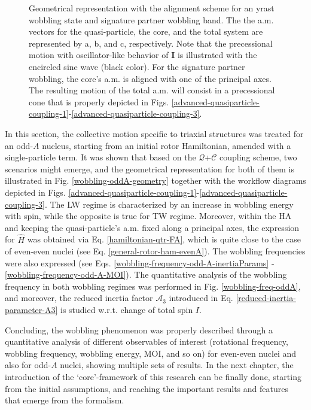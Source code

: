 \begin{figure}
    \caption{Geometrical representation with the alignment scheme for an yrast wobbling state and signature partner wobbling band. The the a.m. vectors for the quasi-particle, the core, and the total system are represented by a, b, and c, respectively. Note that the precessional motion with oscillator-like behavior of $\mathbf{I}$ is illustrated with the encircled sine wave (black color). For the signature partner wobbling, the core's a.m. is aligned with one of the principal axes. The resulting motion of the total a.m. will consist in a precessional cone that is properly depicted in Figs. \ref{advanced-quasiparticle-coupling-1}-\ref{advanced-quasiparticle-coupling-3}.}
    \label{wobbling-geometry-YRAST-SPB}
\end{figure}

In this section, the collective motion specific to triaxial structures was treated for an odd-$A$ nucleus, starting from an initial rotor Hamiltonian, amended with a single-particle term. It was shown that based on the $\mathcal{Q}$+$\mathscr{C}$ coupling scheme, two scenarios might emerge, and the geometrical representation for both of them is illustrated in Fig. \ref{wobbling-oddA-geometry} together with the workflow diagrams depicted in Figs. \ref{advanced-quasiparticle-coupling-1}-\ref{advanced-quasiparticle-coupling-3}. The LW regime is characterized by an increase in wobbling energy with spin, while the opposite is true for TW regime. Moreover, within the HA and keeping the quasi-particle's a.m. fixed along a principal axes, the expression for $\hat{H}$ was obtained via Eq. \ref{hamiltonian-qtr-FA}, which is quite close to the case of even-even nuclei (see Eq. \ref{general-rotor-ham-evenA}). The wobbling frequencies were also expressed (see Eqs. \ref{wobbling-frequency-odd-A-inertiaParams} - \ref{wobbling-frequency-odd-A-MOI}). The quantitative analysis of the wobbling frequency in both wobbling regimes was performed in Fig. \ref{wobbling-freq-oddA}, and moreover, the reduced inertia factor $\mathscr{A}_3$ introduced in Eq. \ref{reduced-inertia-parameter-A3} is studied w.r.t. change of total spin $I$.

Concluding, the wobbling phenomenon was properly described through a quantitative analysis of different observables of interest (rotational frequency, wobbling frequency, wobbling energy, MOI, and so on) for even-even nuclei and also for odd-$A$ nuclei, showing multiple sets of results. In the next chapter, the introduction of the `core'-framework of this research can be finally done, starting from the initial assumptions, and reaching the important results and features that emerge from the formalism.

